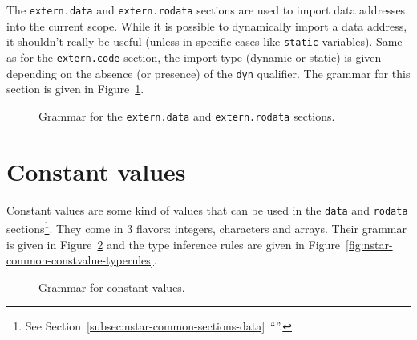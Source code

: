 The \texttt{extern.data} and \texttt{extern.rodata} sections are used to import data addresses into the current scope.
While it is possible to dynamically import a data address, it shouldn't really be useful (unless in specific cases like \texttt{static} variables).
Same as for the \texttt{extern.code} section, the import type (dynamic or static) is given depending on the absence (or presence) of the \texttt{dyn} qualifier.
The grammar for this section is given in Figure~\ref{fig:nstar-common-sections-extern-data-grammar}.

\begin{figure}[htb]
  \centering


  \caption{Grammar for the \texttt{extern.data} and \texttt{extern.rodata} sections.}
  \label{fig:nstar-common-sections-extern-data-grammar}
\end{figure}

\section{Constant values}\label{sec:nstar-common-constvalue}

Constant values are some kind of values that can be used in the \texttt{data} and \texttt{rodata} sections\footnote{See Section~\ref{subsec:nstar-common-sections-data}~``''.}.
They come in 3 flavors: integers, characters and arrays.
Their grammar is given in Figure~\ref{fig:nstar-common-constvalue-grammar} and the type inference rules are given in Figure~\ref{fig:nstar-common-constvalue-typerules}.

\begin{figure}[htb]
  \centering


  \caption{Grammar for constant values.}
  \label{fig:nstar-common-constvalue-grammar}
\end{figure}

